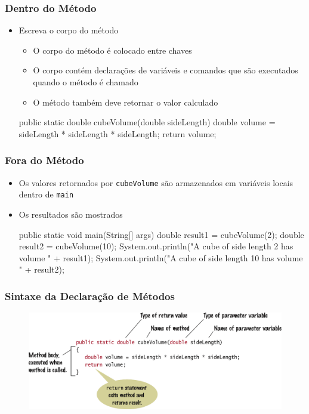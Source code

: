 \documentclass[xcolor={dvipsnames,table},aspectratio=169]{beamer}
\begin{document}
\begin{frame}[fragile]\frametitle{Dentro do Método}
\begin{itemize}
	\item Escreva o corpo do método
	\begin{itemize}
		\item O corpo do método é colocado entre chaves
		\item O corpo contém declarações de variáveis e comandos que são executados quando o método é chamado
		\item O método também deve retornar o valor calculado
	\end{itemize}
\begin{javacode}
public static double cubeVolume(double sideLength) {
  double volume = sideLength * sideLength * sideLength;
  return volume;
}
\end{javacode}
\end{itemize}
\end{frame}

\begin{frame}[fragile]\frametitle{Fora do Método}
\begin{itemize}
	\item Os valores retornados por \texttt{cubeVolume} são armazenados em variáveis locais dentro de \texttt{main}
	\item Os resultados são mostrados
{\scriptsize
\begin{javacode}
public static void main(String[] args) {
   double result1 = cubeVolume(2);
   double result2 = cubeVolume(10);
   System.out.println("A cube of side length 2 has volume "  + result1);
   System.out.println("A cube of side length 10 has volume " + result2);
}
\end{javacode}
}
\end{itemize}
\end{frame}

\begin{frame}\frametitle{Sintaxe da Declaração de Métodos}
\begin{figure}[h]
	\includegraphics[height=0.65\paperheight,center]{pucrs-ep-fprog-unidade_05-metodos-laminas-sintaxe_metodos.png}
\end{figure}
\end{frame}
\end{document}
